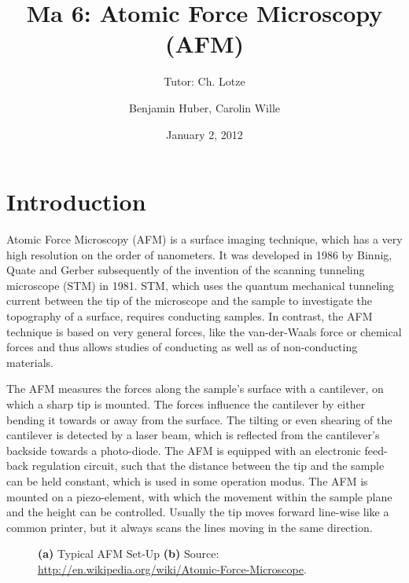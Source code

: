 \documentclass[a4paper]{scrartcl}
\title{Ma 6: Atomic Force Microscopy (AFM)}
\subtitle{Tutor: Ch. Lotze}
\author{Benjamin Huber, Carolin Wille}
\date{January 2, 2012}
\numberwithin{equation}{section}
\numberwithin{figure}{section}
\numberwithin{table}{section}
\begin{document}
\thispagestyle{empty}
\maketitle
\tableofcontents
\clearpage


\section{Introduction}
Atomic Force Microscopy (AFM) is a surface imaging technique, which has a very high resolution on the order of nanometers. It was developed in 1986 by Binnig, Quate and Gerber subsequently of the invention of the scanning tunneling microscope (STM) in 1981. STM, which uses the quantum mechanical tunneling current between the tip of the microscope and the sample to investigate the topography of a surface, requires conducting samples. In contrast, the AFM technique is based on very general forces, like the van-der-Waals force or chemical forces and thus allows studies of conducting as well as of non-conducting materials.

The AFM measures the forces along the sample's surface with a cantilever, on which a sharp tip is mounted. The forces influence the cantilever by either bending it towards or away from the surface. The tilting or even shearing of the cantilever is detected by a laser beam, which is reflected from the cantilever's backside towards a photo-diode. The AFM is equipped with an electronic feed-back regulation circuit, such that the distance between the tip and the sample can be held constant, which is used in some operation modus. The AFM is mounted on a piezo-element, with which the movement within the sample plane and the height can be controlled. Usually the tip moves forward line-wise like a common printer, but it always scans the lines moving in the same direction.

\begin{figure} 
 \centering
{}
\subfloat[][]

\caption{
\small  \textbf{(a)} Typical AFM Set-Up \textbf{(b)} Source: \url{http://en.wikipedia.org/wiki/Atomic-Force-Microscope}. } 
	\label{fig:setup}
\end{figure}
\end{document}
